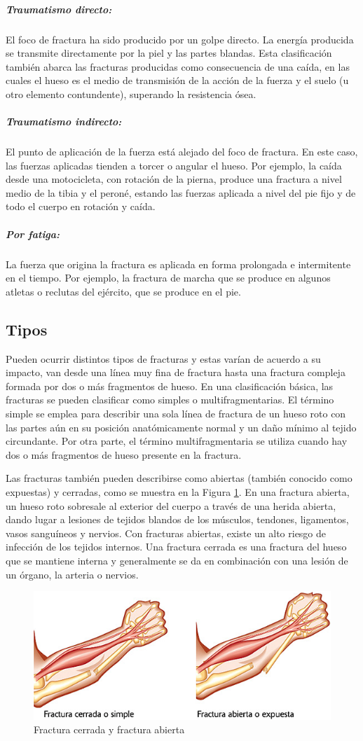 \subparagraph{Traumatismo directo:}El foco de fractura ha sido producido por un golpe directo. La energ\'ia producida se transmite directamente por la piel y las partes blandas. Esta clasificaci\'on tambi\'en abarca las fracturas producidas como consecuencia de una ca\'ida, en las cuales el hueso es el medio de transmisi\'on de la acci\'on de la fuerza y el suelo (u otro elemento contundente), superando la resistencia \'osea.
\subparagraph{Traumatismo indirecto:}El punto de aplicaci\'on de la fuerza est\'a alejado del foco de fractura. En este caso, las fuerzas aplicadas tienden a torcer o angular el hueso. Por ejemplo, la ca\'ida desde una motocicleta, con rotaci\'on de la pierna, produce una fractura a nivel medio de la tibia y el peron\'e, estando las fuerzas aplicada a nivel del pie fijo y de todo el cuerpo en rotaci\'on y ca\'ida.
\subparagraph{Por fatiga:}La fuerza que origina la fractura es aplicada en forma prolongada e intermitente en el tiempo. Por ejemplo, la fractura de marcha que se produce en algunos atletas o reclutas del ej\'ercito, que se produce en el pie.

\subsection{Tipos}

Pueden ocurrir distintos tipos de fracturas y estas var\'ian de acuerdo a su impacto, van desde una l\'inea muy fina de fractura hasta una fractura compleja formada por dos o m\'as fragmentos de hueso. En una clasificaci\'on b\'asica, las fracturas se pueden clasificar como simples o multifragmentarias. El t\'ermino simple se emplea para describir una sola l\'inea de fractura de un hueso roto con las partes a\'un en su posici\'on anat\'omicamente normal y un da\~no m\'inimo al tejido circundante. Por otra parte, el t\'ermino multifragmentaria se utiliza cuando hay dos o m\'as fragmentos de hueso presente en la fractura. 

Las fracturas tambi\'en pueden describirse como abiertas (tambi\'en conocido como expuestas) y cerradas, como se muestra en la Figura \ref{fig:fracture1}. En una fractura abierta, un hueso roto sobresale al exterior del cuerpo a trav\'es de una herida abierta, dando lugar a lesiones de tejidos blandos de los m\'usculos, tendones, ligamentos, vasos sangu\'ineos y nervios. Con fracturas abiertas, existe un alto riesgo de infecci\'on de los tejidos internos. Una fractura cerrada es una fractura del hueso que se mantiene interna y generalmente se da en combinaci\'on con una lesi\'on de un \'organo, la arteria o nervios.
\begin{figure}[htb]
	\centering
		\includegraphics[width=0.60\columnwidth]{images/fractura1.png}
		\caption{Fractura cerrada y fractura abierta}
	\label{fig:fracture1}
\end{figure}

